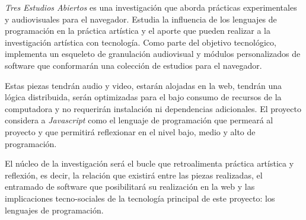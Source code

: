 
\textit{Tres Estudios Abiertos} es una investigación que aborda prácticas experimentales y audiovisuales para el navegador. Estudia la influencia de los lenguajes de programación en la práctica artística y el aporte que pueden realizar a la investigación artística con tecnología. Como parte del objetivo tecnológico, implementa un esqueleto de granulación audiovisual y módulos personalizados de software que conformarán una colección de estudios para el navegador. 


Estas piezas tendrán audio y video, estarán alojadas en la web, tendrán una lógica distribuida, serán optimizadas para el bajo consumo de recursos de la computadora y no requerirán instalación ni dependencias adicionales. El proyecto considera a \textit{Javascript} como el lenguaje de programación que permeará al proyecto y que permitirá reflexionar en el nivel bajo, medio y alto de programación. %

El núcleo de la investigación será el bucle que retroalimenta práctica artística y reflexión, es decir, la relación que existirá entre las piezas realizadas, el entramado de software que posibilitará su realización en la web y las implicaciones tecno-sociales de la tecnología principal de este proyecto: los lenguajes de programación. 
